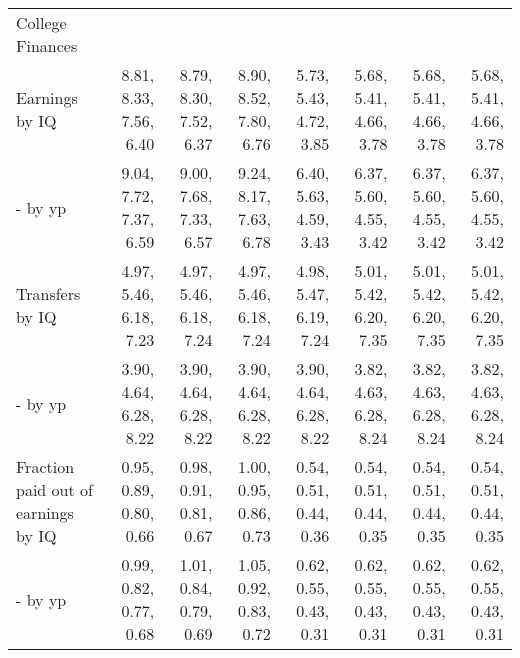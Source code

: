\begin{tabular}{lrrrrrrr}
\hline
College Finances &   &   &   &   &   &   &   \\ 
Earnings by IQ & 8.81, 8.33, 7.56, 6.40  & 8.79, 8.30, 7.52, 6.37  & 8.90, 8.52, 7.80, 6.76  & 5.73, 5.43, 4.72, 3.85  & 5.68, 5.41, 4.66, 3.78  & 5.68, 5.41, 4.66, 3.78  & 5.68, 5.41, 4.66, 3.78  \\ 
- by yp & 9.04, 7.72, 7.37, 6.59  & 9.00, 7.68, 7.33, 6.57  & 9.24, 8.17, 7.63, 6.78  & 6.40, 5.63, 4.59, 3.43  & 6.37, 5.60, 4.55, 3.42  & 6.37, 5.60, 4.55, 3.42  & 6.37, 5.60, 4.55, 3.42  \\ 
Transfers by IQ & 4.97, 5.46, 6.18, 7.23  & 4.97, 5.46, 6.18, 7.24  & 4.97, 5.46, 6.18, 7.24  & 4.98, 5.47, 6.19, 7.24  & 5.01, 5.42, 6.20, 7.35  & 5.01, 5.42, 6.20, 7.35  & 5.01, 5.42, 6.20, 7.35  \\ 
- by yp & 3.90, 4.64, 6.28, 8.22  & 3.90, 4.64, 6.28, 8.22  & 3.90, 4.64, 6.28, 8.22  & 3.90, 4.64, 6.28, 8.22  & 3.82, 4.63, 6.28, 8.24  & 3.82, 4.63, 6.28, 8.24  & 3.82, 4.63, 6.28, 8.24  \\ 
Fraction paid out of earnings by IQ & 0.95, 0.89, 0.80, 0.66  & 0.98, 0.91, 0.81, 0.67  & 1.00, 0.95, 0.86, 0.73  & 0.54, 0.51, 0.44, 0.36  & 0.54, 0.51, 0.44, 0.35  & 0.54, 0.51, 0.44, 0.35  & 0.54, 0.51, 0.44, 0.35  \\ 
- by yp & 0.99, 0.82, 0.77, 0.68  & 1.01, 0.84, 0.79, 0.69  & 1.05, 0.92, 0.83, 0.72  & 0.62, 0.55, 0.43, 0.31  & 0.62, 0.55, 0.43, 0.31  & 0.62, 0.55, 0.43, 0.31  & 0.62, 0.55, 0.43, 0.31  \\ 
\hline
\end{tabular}%
